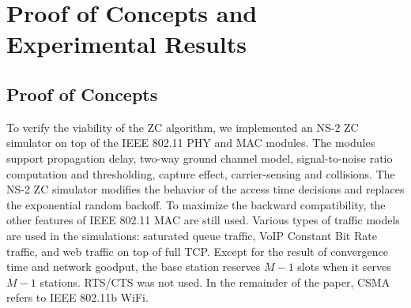 \documentclass{acm_proc_article-sp}
\begin{document}
\section{Proof of Concepts and Experimental Results}
\label{s.experiment}
\subsection{Proof of Concepts}
To verify the viability of the ZC algorithm, we implemented an NS-2 ZC simulator on top of the IEEE 802.11 PHY and MAC modules.
The modules support propagation delay, two-way ground channel model, signal-to-noise ratio computation and thresholding, capture effect, carrier-sensing
and collisions. The NS-2 ZC simulator modifies the behavior of the access time decisions and replaces the exponential random backoff.
To maximize the backward compatibility, the other features of IEEE 802.11 MAC are still used. Various types of traffic models are used in the simulations:
saturated queue traffic, VoIP Constant Bit Rate traffic, and web traffic on top of full TCP. Except for the result of convergence time and network goodput, the base station reserves $M-1$ slots when it serves $M-1$ stations. RTS/CTS was not used. In the remainder of the paper, CSMA refers to IEEE 802.11b WiFi.
\end{document}
